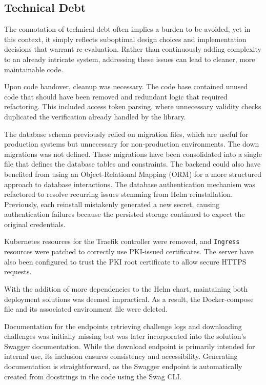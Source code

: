 \subsection{Technical Debt}
The connotation of technical debt often implies a burden to be avoided, yet in this context, it simply reflects suboptimal design choices and implementation decisions that warrant re-evaluation. Rather than continuously adding complexity to an already intricate system, addressing these issues can lead to cleaner, more maintainable code.

Upon code handover, cleanup was necessary. The code base contained unused code that should have been removed and redundant logic that required refactoring. This included access token parsing, where unnecessary validity checks duplicated the verification already handled by the library.

The database schema previously relied on migration files, which are useful for production systems but unnecessary for non-production environments. The down migrations was not defined. These migrations have been consolidated into a single file that defines the database tables and constraints. The backend could also have benefited from using an Object-Relational Mapping (ORM) for a more structured approach to database interactions. The database authentication mechanism was refactored to resolve recurring issues stemming from Helm reinstallation. Previously, each reinstall mistakenly generated a new secret, causing authentication failures because the persisted storage continued to expect the original credentials.

Kubernetes resources for the Traefik controller were removed, and \texttt{Ingress} resources were patched to correctly use PKI-issued certificates. The server have also been configured to trust the PKI root certificate to allow secure HTTPS requests. 

With the addition of more dependencies to the Helm chart, maintaining both deployment solutions was deemed impractical. As a result, the Docker-compose file and its associated environment file were deleted.

Documentation for the endpoints retrieving challenge logs and downloading challenges was initially missing but was later incorporated into the solution's Swagger documentation. While the download endpoint is primarily intended for internal use, its inclusion ensures consistency and accessibility. Generating documentation is straightforward, as the Swagger endpoint is automatically created from docstrings in the code using the Swag CLI.


